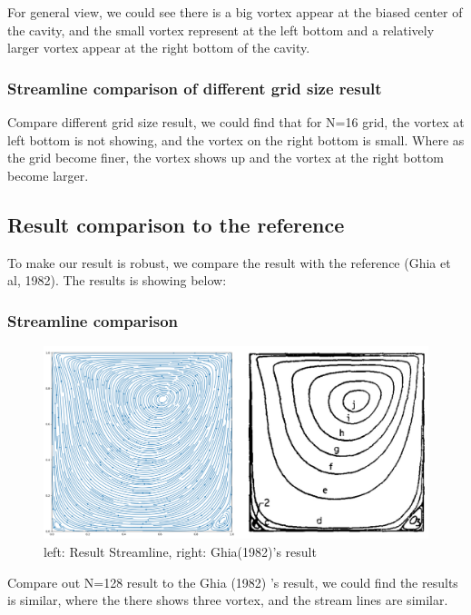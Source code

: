 \documentclass[12pt]{article}
\begin{document}
For general view, we could see there is a big vortex appear at the biased center of the cavity, 
and the small vortex represent at 
the left bottom and a relatively larger vortex appear at the  right bottom of the cavity.\\


\subsubsection{Streamline comparison of different grid size result}
Compare different grid size result, 
we could find that for N=16 grid, 
the vortex at left bottom is not showing,
 and the vortex on the right bottom is small. 
 Where as the grid become finer, 
 the vortex shows up and the vortex at 
 the right bottom become larger.







\subsection{Result comparison to the reference}

To make our result is robust, we compare the result with the reference (Ghia et al, 1982)\cite{GHIA1982387}. The results is showing below:

\subsubsection{Streamline comparison}
\begin{figure}[H]
    \centering
    \includegraphics[width=0.9\linewidth]{figures/Re=100_result/Compare.jpg}
    \caption{left: Result Streamline, right: Ghia(1982)\cite{GHIA1982387}'s result}
\end{figure}

Compare out N=128 result to the Ghia (1982)\cite{GHIA1982387} 's result, we could find the results is similar, where the there shows three vortex, and the stream lines are similar.
\end{document}
